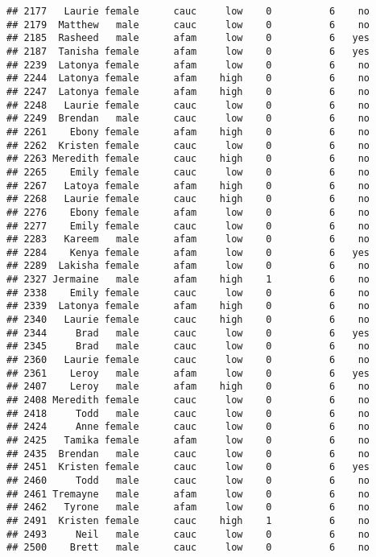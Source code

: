 \documentclass[
]{article}
\begin{document}
\begin{verbatim}
## 2177   Laurie female      cauc     low    0          6    no
## 2179  Matthew   male      cauc     low    0          6    no
## 2185  Rasheed   male      afam     low    0          6   yes
## 2187  Tanisha female      afam     low    0          6   yes
## 2239  Latonya female      afam     low    0          6    no
## 2244  Latonya female      afam    high    0          6    no
## 2247  Latonya female      afam    high    0          6    no
## 2248   Laurie female      cauc     low    0          6    no
## 2249  Brendan   male      cauc     low    0          6    no
## 2261    Ebony female      afam    high    0          6    no
## 2262  Kristen female      cauc     low    0          6    no
## 2263 Meredith female      cauc    high    0          6    no
## 2265    Emily female      cauc     low    0          6    no
## 2267   Latoya female      afam    high    0          6    no
## 2268   Laurie female      cauc    high    0          6    no
## 2276    Ebony female      afam     low    0          6    no
## 2277    Emily female      cauc     low    0          6    no
## 2283   Kareem   male      afam     low    0          6    no
## 2284    Kenya female      afam     low    0          6   yes
## 2289  Lakisha female      afam     low    0          6    no
## 2327 Jermaine   male      afam    high    1          6    no
## 2338    Emily female      cauc     low    0          6    no
## 2339  Latonya female      afam    high    0          6    no
## 2340   Laurie female      cauc    high    0          6    no
## 2344     Brad   male      cauc     low    0          6   yes
## 2345     Brad   male      cauc     low    0          6    no
## 2360   Laurie female      cauc     low    0          6    no
## 2361    Leroy   male      afam     low    0          6   yes
## 2407    Leroy   male      afam    high    0          6    no
## 2408 Meredith female      cauc     low    0          6    no
## 2418     Todd   male      cauc     low    0          6    no
## 2424     Anne female      cauc     low    0          6    no
## 2425   Tamika female      afam     low    0          6    no
## 2435  Brendan   male      cauc     low    0          6    no
## 2451  Kristen female      cauc     low    0          6   yes
## 2460     Todd   male      cauc     low    0          6    no
## 2461 Tremayne   male      afam     low    0          6    no
## 2462   Tyrone   male      afam     low    0          6    no
## 2491  Kristen female      cauc    high    1          6    no
## 2493     Neil   male      cauc     low    0          6    no
## 2500    Brett   male      cauc     low    0          6    no

\end{verbatim}
\end{document}

